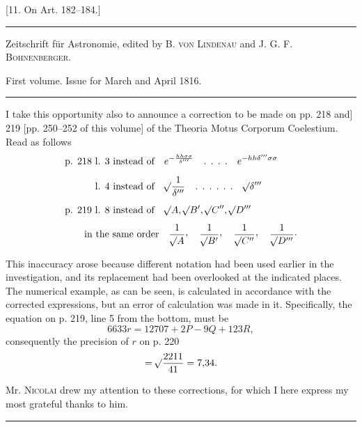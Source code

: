 \begin{center}
[11. On Art. 182--184.]
\end{center}
\begin{center}
\small
\rule{\textwidth}{.35pt}\par
Zeitschrift für Astronomie, edited by B. \textsc{von Lindenau} and J. G. F. \textsc{Bohnenberger}.\par
First volume. Issue for March and April 1816.\par
\rule{\textwidth}{.35pt}
\end{center}
I take this opportunity also to announce a correction to be made on pp. 218 and] 219 [pp. 250--252 of this volume] of the Theoria Motus Corporum Coelestium. Read as follows
\[
\begin{aligned}
&\text{p. 218 l. 3 instead of}\quad e^{-\frac{hh\sigma\sigma}{\delta'''}}\quad\text{. . . .}\quad e^{-hh\delta'''\sigma\sigma}\\[5pt]
&\phantom{\text{p. 218 }}\text{l. 4 instead of}\quad\BareRoot{\frac{1}{\delta'''}}\quad\text{. . . . . .}\quad\BareRoot{\delta'''}\\[5pt]
&\text{p. 219 l. 8 instead of}\quad\BareRoot{A},\BareRoot{B'},\BareRoot{C''},\BareRoot{D'''}\\[4pt]
&\qquad\text{in the same order}\quad
\frac{1}{\BareRoot{A}}\mathpunct{\raisebox{.45ex}{,}}\quad
\frac{1}{\BareRoot{B'}}\mathpunct{\raisebox{.45ex}{,}}\quad
\frac{1}{\BareRoot{C''}}\mathpunct{\raisebox{.45ex}{,}}\quad
\frac{1}{\BareRoot{D'''}}\mathpunct{\cdot}
\end{aligned}
\]

This inaccuracy arose because different notation had been used earlier in the investigation, and its replacement had been overlooked at the indicated places. The numerical example, as can be seen, is calculated in accordance with the corrected expressions, but an error of calculation was made in it. Specifically, the equation on p. 219, line 5 from the bottom, must be
\[
6633r=12707+2P-9Q+123R,
\]
consequently the precision of \(r\) on p. 220
\[
=\mathord{{}^{}\!\surd}\frac{2211}{41}=7{,}34.
\]

Mr. \textsc{Nicolai} drew my attention to these corrections, for which I here express my most grateful thanks to him.
\begin{center}\rule{.18\textwidth}{.35pt}\end{center}
